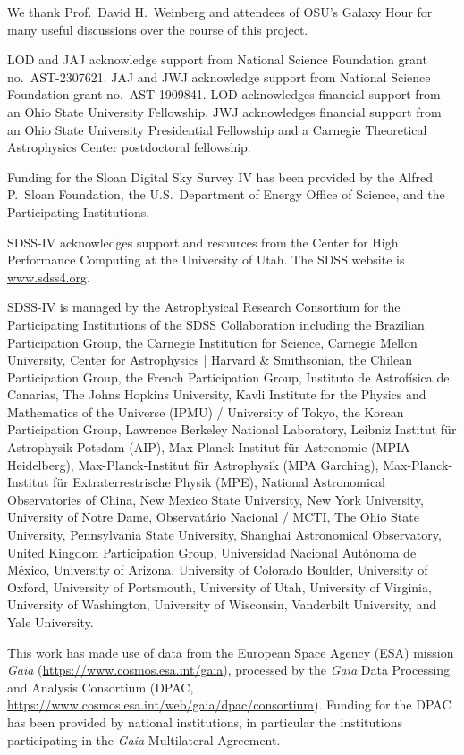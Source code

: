 \documentclass[twocolumn,twocolappendix,linenumbers]{aastex631}
\begin{document}
We thank Prof.\ David H.\ Weinberg and attendees of OSU's Galaxy Hour for many useful discussions over the course of this project.

LOD and JAJ acknowledge support from National Science Foundation grant no.\ AST-2307621. JAJ and JWJ acknowledge support from National Science Foundation grant no.\ AST-1909841.
LOD acknowledges financial support from an Ohio State University Fellowship.
JWJ acknowledges financial support from an Ohio State University Presidential Fellowship and a Carnegie Theoretical Astrophysics Center postdoctoral fellowship.

Funding for the Sloan Digital Sky 
Survey IV has been provided by the 
Alfred P.\ Sloan Foundation, the U.S.\ 
Department of Energy Office of 
Science, and the Participating 
Institutions. 

SDSS-IV acknowledges support and 
resources from the Center for High 
Performance Computing  at the 
University of Utah. The SDSS 
website is \url{www.sdss4.org}.

SDSS-IV is managed by the 
Astrophysical Research Consortium 
for the Participating Institutions 
of the SDSS Collaboration including 
the Brazilian Participation Group, 
the Carnegie Institution for Science, 
Carnegie Mellon University, Center for 
Astrophysics | Harvard \& 
Smithsonian, the Chilean Participation 
Group, the French Participation Group, 
Instituto de Astrof\'isica de 
Canarias, The Johns Hopkins 
University, Kavli Institute for the 
Physics and Mathematics of the 
Universe (IPMU) / University of 
Tokyo, the Korean Participation Group, 
Lawrence Berkeley National Laboratory, 
Leibniz Institut f\"ur Astrophysik 
Potsdam (AIP),  Max-Planck-Institut 
f\"ur Astronomie (MPIA Heidelberg), 
Max-Planck-Institut f\"ur 
Astrophysik (MPA Garching), 
Max-Planck-Institut f\"ur 
Extraterrestrische Physik (MPE), 
National Astronomical Observatories of 
China, New Mexico State University, 
New York University, University of 
Notre Dame, Observat\'ario 
Nacional / MCTI, The Ohio State 
University, Pennsylvania State 
University, Shanghai 
Astronomical Observatory, United 
Kingdom Participation Group, 
Universidad Nacional Aut\'onoma 
de M\'exico, University of Arizona, 
University of Colorado Boulder, 
University of Oxford, University of 
Portsmouth, University of Utah, 
University of Virginia, University 
of Washington, University of 
Wisconsin, Vanderbilt University, 
and Yale University.

This work has made use of data from the European Space Agency (ESA) mission
{\it Gaia} (\url{https://www.cosmos.esa.int/gaia}), processed by the {\it Gaia}
Data Processing and Analysis Consortium (DPAC,
\url{https://www.cosmos.esa.int/web/gaia/dpac/consortium}). Funding for the DPAC
has been provided by national institutions, in particular the institutions
participating in the {\it Gaia} Multilateral Agreement.
\end{document}
